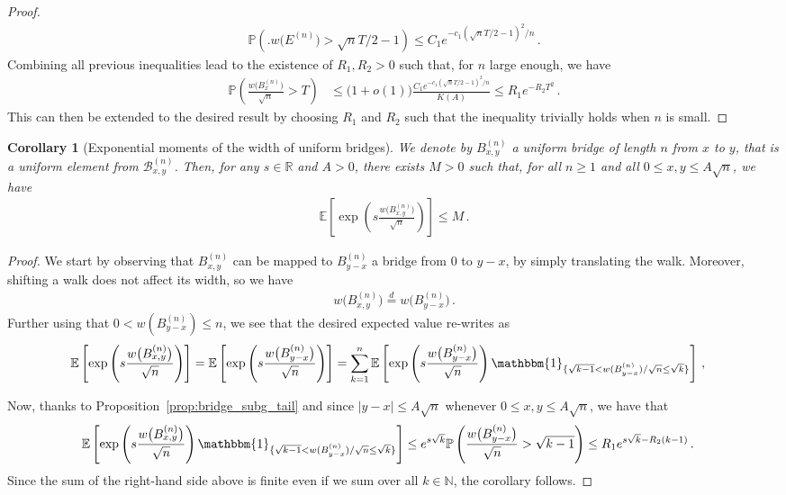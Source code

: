 \documentclass{article}
\newcommand{\pr}{\mathbb{P}}								%
\newcommand{\Prob}[1]{\pr\left(#1\right)}					%
\newcommand{\E}{\mathbb{E}}								%
\newcommand{\Exp}[1]{\E\left[#1\right]}					%
\newcommand{\1}{\mathbbm{1}}								%
\newtheorem{corollary}[theorem]{Corollary}
\theoremstyle{definition}
\numberwithin{equation}{section}
\newcommand{\cB}{\mathcal B}
\newcommand{\N}{\mathbb N}
\newcommand{\R}{\mathbb R}
\begin{document}
\begin{proof}
\begin{align*}
    \Prob{\Big.w\big(E^{(n)}\big)>\sqrt{n}T/2-1}\leq C_1e^{-c_1(\sqrt{n}T/2-1)^2/n}\,.
\end{align*}
Combining all previous inequalities lead to the existence of $R_1,R_2>0$ such that, for $n$ large enough, we have
\begin{align*}
    \Prob{\frac{w\big(B^{(n)}_x\big)}{\sqrt{n}}>T} &\leq \big(1+o(1)\big)\frac{C_1e^{-c_1(\sqrt{n}T/2-1)^2/n}}{K(A)}\leq R_1e^{-R_2T^2}\,.
\end{align*}
This can then be extended to the desired result by choosing $R_1$ and $R_2$ such that the inequality trivially holds when $n$ is small.
\end{proof}

\begin{corollary}[Exponential moments of the width of uniform bridges]\label{cor:exp_mom_local_time}
    We denote by $B^{(n)}_{x,y}$ a uniform bridge of length $n$ from $x$ to $y$, that is a uniform element from $\cB^{(n)}_{x,y}$.
    Then, for any $s\in\R$ and $A>0$, there exists $M>0$ such that, for all $n\geq1$ and all $0\leq x,y\leq A\sqrt{n}$, we have
    \begin{align*}
        \Exp{\exp\left(s\frac{w\big(B^{(n)}_{x,y}\big)}{\sqrt{n}}\right)}\leq M\,.
    \end{align*}
\end{corollary}

\begin{proof}
    We start by observing that $B^{(n)}_{x,y}$ can be mapped to $B^{(n)}_{y-x}$ a bridge from $0$ to $y-x$, by simply translating the walk.
    Moreover, shifting a walk does not affect its width, so we have
    \begin{align*}
        w\big(B^{(n)}_{x,y}\big)\overset{d}{=}w\big(B^{(n)}_{y-x}\big)\,.
    \end{align*}
    Further using that $0<w(B^{(n)}_{y-x})\leq n$, we see that the desired expected value re-writes as
    \begin{align*}
        \Exp{\exp\left(s\frac{w\big(B^{(n)}_{x,y}\big)}{\sqrt{n}}\right)}
        &=\Exp{\exp\left(s\frac{w\big(B^{(n)}_{y-x}\big)}{\sqrt{n}}\right)}
        =\sum_{k=1}^n\Exp{\exp\left(s\frac{w\big(B^{(n)}_{y-x}\big)}{\sqrt{n}}\right)\mathbbm{1}_{\{\sqrt{k-1}<w(B^{(n)}_{y-x})/\sqrt{n}\leq\sqrt{k}\}}}\,,
    \end{align*}
    
    Now, thanks to Proposition~\ref{prop:bridge_subg_tail} and since $|y-x|\leq A\sqrt{n}$ whenever $0\leq x,y\leq A\sqrt{n}$, we have that
    \begin{align*}
        \Exp{\exp\left(s\frac{w\big(B^{(n)}_{x,y}\big)}{\sqrt{n}}\right)\mathbbm{1}_{\{\sqrt{k-1}<w(B^{(n)}_{y-x})/\sqrt{n}\leq\sqrt{k}\}}}
        &\leq e^{s\sqrt{k}}\Prob{\frac{w\big(B^{(n)}_{y-x}\big)}{\sqrt{n}}>\sqrt{k-1}}
        \leq R_1e^{s\sqrt{k}-R_2(k-1)}\,.
    \end{align*}
    Since the sum of the right-hand side above is finite even if we sum over all $k \in \N$, the corollary follows.
\end{proof}
\end{document}
